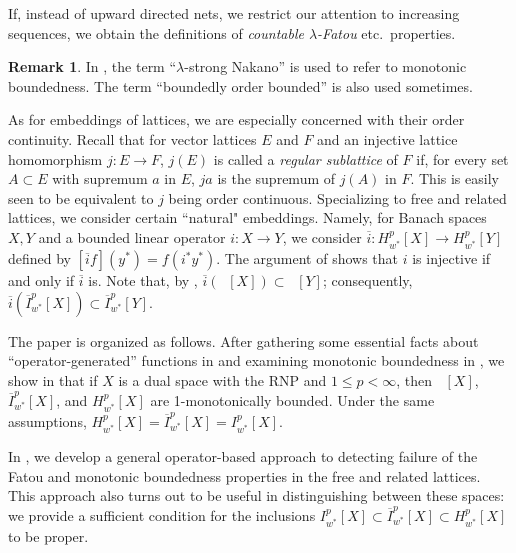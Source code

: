 \documentclass{amsart}
\theoremstyle{plain}
\theoremstyle{definition}
\newtheorem{remark}[theorem]{Remark}
\numberwithin{equation}{section}
\DeclareMathOperator{\FBLp}{FBL^{\mathit{(p)}}}
\newcommand{\Hp}{H_{w^*}^{p}}
\newcommand{\nip}{I_{w^*}^{p}}
\newcommand{\Ip}{\overline{I}_{w^*}^{p}}
\begin{document}
If, instead of upward directed nets, we restrict our attention to increasing sequences, we obtain the definitions of \emph{countable $\lambda$-Fatou} etc.~properties.
\begin{remark}
 In \cite{ABT}, the term ``$\lambda$-strong Nakano'' is used to refer to monotonic boundedness. The term ``boundedly order bounded'' is also used sometimes.
\end{remark}

As for embeddings of lattices, we are especially concerned with their order continuity. Recall that for vector lattices $E$ and $F$ and an injective lattice homomorphism $j: E \to F$, $j(E)$ is called a \emph{regular sublattice} of $F$ if, for every set $A \subset E$ with supremum $a$ in $E$, $ja$ is the supremum of $j(A)$ in $F$. This is easily seen to be equivalent to $j$ being order continuous.
Specializing to free and related lattices, we consider certain ``natural" embeddings. Namely, for Banach spaces $X, Y$ and a bounded linear operator $i: X \to Y$, we consider $\overline{i}: \Hp[X] \to \Hp[Y]$ defined by $[\overline{i} f](y^*) = f(i^* y^*)$. %
The argument of \cite{OiTTT-cor} shows that $i$ is injective if and only if $\overline{i}$ is. Note that, by \cite{OiTTT}, $\overline{i}(\FBLp[X]) \subset \FBLp[Y]$; consequently, $\overline{i}(\Ip[X]) \subset \Ip[Y]$.

The paper is organized as follows. After gathering some essential facts about ``operator-generated'' functions in  and examining monotonic boundedness in , we show in  that if $X$ is a dual space with the RNP and $1 \leq p < \infty$, then $\FBLp[X]$, $\Ip[X]$, and $\Hp[X]$ are 1-monotonically bounded. Under the same assumptions, $\Hp[X]=\Ip[X] = \nip[X]$.

In , we develop a general operator-based approach to detecting failure of the Fatou and monotonic boundedness properties in the free and related lattices. This approach also turns out to be useful in distinguishing between these spaces: we provide a sufficient condition for the inclusions $\nip[X] \subset \Ip[X] \subset \Hp[X]$ to be proper.
\end{document}

